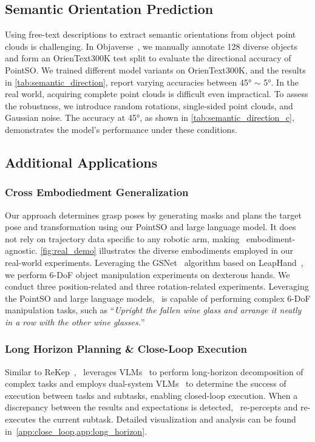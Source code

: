 \subsection{Semantic Orientation Prediction}
Using free-text descriptions to extract semantic orientations from object point clouds is challenging. In Objaverse~\cite{objaverse23}, we manually annotate 128 diverse objects and form an OrienText300K test split to evaluate the directional accuracy of PointSO. We trained different model variants on OrienText300K, and the results in \cref{tab:semantic_direction}, report varying accuracies between 45° $ \sim $ 5°.
In the real world, acquiring complete point clouds is difficult even impractical. To assess the robustness, we introduce random rotations, single-sided point clouds, and Gaussian noise. The accuracy at 45°, as shown in \cref{tab:semantic_direction_c}, demonstrates the model's performance under these conditions.

\subsection{Additional Applications}

\subsubsection{Cross Embodiedment Generalization}
Our approach determines grasp poses by generating masks and plans the target pose and transformation using our PointSO and large language model. It does not rely on trajectory data specific to any robotic arm, making \sofar~embodiment-agnostic. \cref{fig:real_demo} illustrates the diverse embodiments employed in our real-world experiments. Leveraging the GSNet~\cite{GSNet21} algorithm based on LeapHand~\cite{leaphand23}, we perform 6-DoF object manipulation experiments on dexterous hands. We conduct three position-related and three rotation-related experiments. Leveraging the PointSO and large language models, \ours~is capable of performing complex 6-DoF manipulation tasks, such as ``\textit{Upright the fallen wine glass and arrange it neatly in a row with the other wine glasses.}''

\subsubsection{Long Horizon Planning \& Close-Loop Execution}
Similar to ReKep~\cite{ReKep24}, \ours~leverages VLMs~\cite{GPT4o24,gemini23} to perform long-horizon decomposition of complex tasks and employs dual-system VLMs~\cite{GPT4o24,gemini23} to determine the success of execution between tasks and subtasks, enabling closed-loop execution. When a discrepancy between the results and expectations is detected, \ours~re-percepts and re-executes the current subtask. Detailed visualization and analysis can be found in~\cref{app:close_loop,app:long_horizon}.

